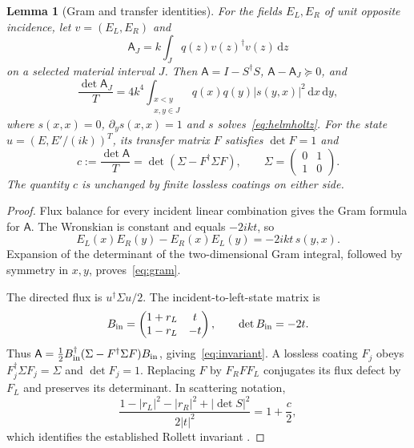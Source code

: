 \documentclass[11pt,a4paper]{article}
\newtheorem{lemma}[theorem]{Lemma}
\theoremstyle{remark}
\newcommand{\abs}[1]{\lvert #1\rvert}
\newcommand{\dd}{\,\mathrm d}
\begin{document}
\begin{lemma}[Gram and transfer identities]\label{lem:gram}
For the fields $E_L,E_R$ of unit opposite incidence, let $v=(E_L,E_R)$ and
\[
 \mathsf A_J=k\int_J q(z)v(z)^\dagger v(z)\dd z
\]
on a selected material interval $J$. Then $\mathsf A=I-S^\dagger S$, $\mathsf A-\mathsf A_J\succeq0$, and
\begin{equation}\label{eq:gram}
 \frac{\det\mathsf A_J}{T}
 =4k^4\int_{\substack{x<y\\x,y\in J}}
 q(x)q(y)\abs{s(y,x)}^2\dd x\dd y,
\end{equation}
where $s(x,x)=0$, $\partial_y s(x,x)=1$ and $s$ solves~\eqref{eq:helmholtz}. For the state $u=(E,E'/(ik))^T$, its transfer matrix $F$ satisfies $\det F=1$ and
\begin{equation}\label{eq:invariant}
 c:=\frac{\det\mathsf A}{T}=\det(\Sigma-F^\dagger\Sigma F),\qquad
 \Sigma=\begin{pmatrix}0&1\\1&0\end{pmatrix}.
\end{equation}
The quantity $c$ is unchanged by finite lossless coatings on either side.
\end{lemma}
\begin{proof}
Flux balance for every incident linear combination gives the Gram formula for $\mathsf A$. The Wronskian is constant and equals $-2ikt$, so
\[
 E_L(x)E_R(y)-E_R(x)E_L(y)=-2ikt\,s(y,x).
\]
Expansion of the determinant of the two-dimensional Gram integral, followed by symmetry in $x,y$, proves~\eqref{eq:gram}.

The directed flux is $u^\dagger\Sigma u/2$. The incident-to-left-state matrix is
\[
 B_{\rm in}=\begin{pmatrix}1+r_L&t\\1-r_L&-t\end{pmatrix},\qquad
 \det B_{\rm in}=-2t.
\]
Thus $\mathsf A=\tfrac12B_{\rm in}^\dagger(\Sigma-F^\dagger\Sigma F)B_{\rm in}$, giving~\eqref{eq:invariant}. A lossless coating $F_j$ obeys $F_j^\dagger\Sigma F_j=\Sigma$ and $\det F_j=1$. Replacing $F$ by $F_RF F_L$ conjugates its flux defect by $F_L$ and preserves its determinant. In scattering notation,
\[
 \frac{1-\abs{r_L}^2-\abs{r_R}^2+\abs{\det S}^2}{2\abs t^2}
 =1+\frac{c}{2},
\]
which identifies the established Rollett invariant \citep{Rollett1962}.
\end{proof}
\end{document}

